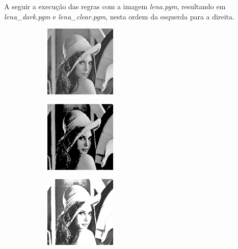 \documentclass{article}
\begin{document}
        A seguir a execução das regras com a imagem \textit{lena.pgm}, resultando em \textit{lena\_dark.pgm} e \textit{lena\_clear.pgm}, nesta ordem da esquerda para a direita.
        \begin{figure}[h]
        \centering
            \begin{subfigure}
            \centering
            \includegraphics[width=139px, height=129px]{images/lena.jpg}
            \end{subfigure}
            \begin{subfigure}
            \centering
            \includegraphics[width=139px, height=129px]{images/lena_dark.jpg}
            \end{subfigure}
            \begin{subfigure}
            \centering
            \includegraphics[width=139px, height=129px]{images/lena_clear.jpg}
            \end{subfigure}
        \end{figure}
\end{document}
